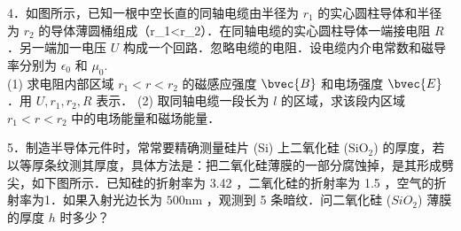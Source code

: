 4．如图所示，已知一根中空长直的同轴电缆由半径为 $r_1$ 的实心圆柱导体和半径为 $r_2$ 的导体薄圆桶组成（r_1<r_2）．在同轴电缆的实心圆柱导体一端接电阻 $R$．另一端加一电压 $U$ 构成一个回路．忽略电缆的电阻．设电缆内介电常数和磁导率分别为 $\epsilon_0$ 和 $\mu_0$.\\
(1) 求电阻内部区域 $r_1<r<r_2$ 的磁感应强度 $\bvec{B}$ 和电场强度 $\bvec{E}$．用 $U,r_1,r_2,R$ 表示．
(2) 取同轴电缆一段长为 $l$ 的区域，求该段内区域 $r_1<r<r_2$ 中的电场能量和磁场能量．


5．制造半导体元件时，常常要精确测量硅片 (Si) 上二氧化硅 ($\mathrm{SiO_2}$) 的厚度，若以等厚条纹测其厚度，具体方法是：把二氧化硅薄膜的一部分腐蚀掉，是其形成劈尖，如下图所示．已知硅的折射率为 3.42 ，二氧化硅的折射率为 1.5 ，空气的折射率为1．如果入射光边长为 $500\mathrm{nm}$ ，观测到 5 条暗纹．问二氧化硅 ($SiO_2$) 薄膜的厚度 $h$ 时多少？
